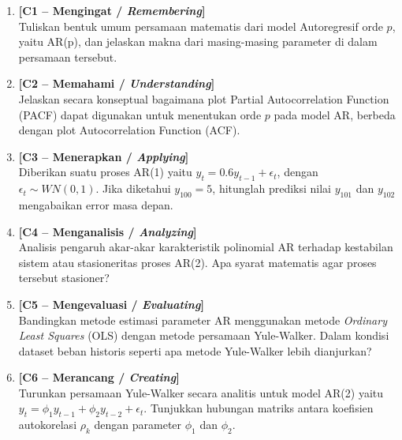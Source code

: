 \documentclass[11pt,a4paper]{article}
\begin{document}
\begin{enumerate}[leftmargin=1.8em, label=\textbf{Soal \arabic*.}]
    
    \item \textbf{[C1 -- Mengingat / \textit{Remembering}]} \\
    Tuliskan bentuk umum persamaan matematis dari model Autoregresif orde $p$, yaitu AR(p), dan jelaskan makna dari masing-masing parameter di dalam persamaan tersebut.
    \vspace{2.2cm}

    \item \textbf{[C2 -- Memahami / \textit{Understanding}]} \\
    Jelaskan secara konseptual bagaimana plot Partial Autocorrelation Function (PACF) dapat digunakan untuk menentukan orde $p$ pada model AR, berbeda dengan plot Autocorrelation Function (ACF).
    \vspace{2.8cm}

    \item \textbf{[C3 -- Menerapkan / \textit{Applying}]} \\
    Diberikan suatu proses AR(1) yaitu $y_t = 0.6 y_{t-1} + \epsilon_t$, dengan $\epsilon_t \sim WN(0, 1)$. Jika diketahui $y_{100} = 5$, hitunglah prediksi nilai $y_{101}$ dan $y_{102}$ mengabaikan error masa depan.
    \vspace{2.8cm}

    \newpage

    \item \textbf{[C4 -- Menganalisis / \textit{Analyzing}]} \\
    Analisis pengaruh akar-akar karakteristik polinomial AR terhadap kestabilan sistem atau stasioneritas proses AR(2). Apa syarat matematis agar proses tersebut stasioner?
    \vspace{3.5cm}

    \item \textbf{[C5 -- Mengevaluasi / \textit{Evaluating}]} \\
    Bandingkan metode estimasi parameter AR menggunakan metode \textit{Ordinary Least Squares} (OLS) dengan metode persamaan Yule-Walker. Dalam kondisi dataset beban historis seperti apa metode Yule-Walker lebih dianjurkan?
    \vspace{3.5cm}

    \item \textbf{[C6 -- Merancang / \textit{Creating}]} \\
    Turunkan persamaan Yule-Walker secara analitis untuk model AR(2) yaitu $y_t = \phi_1 y_{t-1} + \phi_2 y_{t-2} + \epsilon_t$. Tunjukkan hubungan matriks antara koefisien autokorelasi $\rho_k$ dengan parameter $\phi_1$ dan $\phi_2$.
    \vspace{4.5cm}

\end{enumerate}
\end{document}
